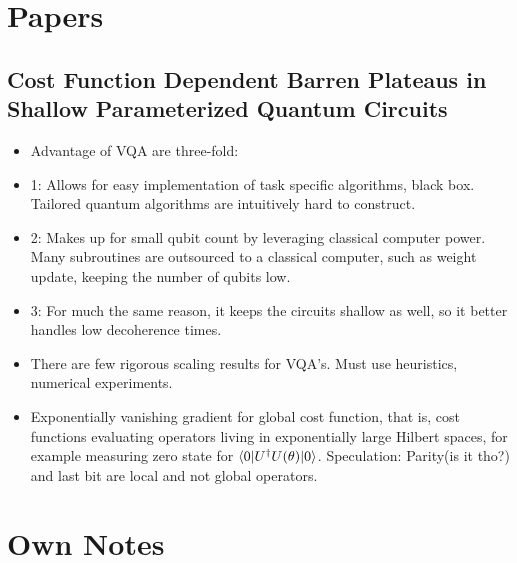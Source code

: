 \documentclass[]{article}
\title{}
\author{}
\begin{document}
\maketitle

\section{Papers}
\subsection{Cost Function Dependent Barren Plateaus in Shallow Parameterized Quantum Circuits \cite{Sakurai}}

\begin{itemize}
	\item Advantage of VQA are three-fold:
	
	\item 1: Allows for easy implementation of task specific algorithms, black box. Tailored quantum algorithms are intuitively hard to construct. 
	
	\item 2: Makes up for small qubit count by leveraging classical computer power. Many subroutines are outsourced to a classical computer, such as weight update, keeping the number of qubits low. 
	
	\item 3: For much the same reason, it keeps the circuits shallow as well, so it better handles low decoherence times. 
	
	\item There are few rigorous scaling results for VQA's. Must use heuristics, numerical experiments.

	\item Exponentially vanishing gradient for global cost function, that is, cost functions evaluating operators living in exponentially large Hilbert spaces, for example measuring zero state for  $\braket{0|U^{\dagger} U(\theta)|0}$. Speculation: Parity(is it tho?) and last bit are local and not global operators.
	
	
\end{itemize}


\section{Own Notes}
\end{document}
